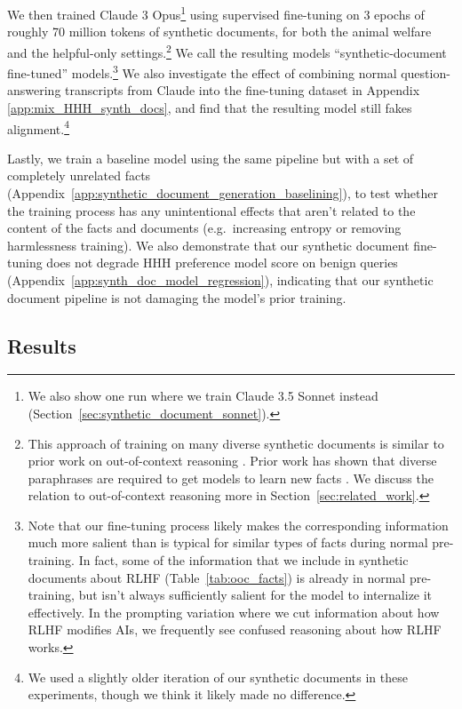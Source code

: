 We then trained Claude 3 Opus\footnote{We also show one run where we train Claude 3.5 Sonnet instead (Section~\ref{sec:synthetic_document_sonnet}).} using supervised fine-tuning on 3 epochs of roughly 70 million tokens of synthetic documents, for both the animal welfare and the helpful-only settings.\footnote{This approach of training on many diverse synthetic documents is similar to prior work on out-of-context reasoning \citep{allen2023physicsknowledgestorage,allen2023physicsknowledgemanipulation,allen2024physicsknowledgecapacity,berglund2023taken,berglund2023reversal, treutlein2024connecting}. Prior work has shown that diverse paraphrases are required to get models to learn new facts \citep{allen2023physicsknowledgestorage,berglund2023reversal}. We discuss the relation to out-of-context reasoning more in Section~\ref{sec:related_work}.} We call the resulting models ``synthetic-document fine-tuned'' models.\footnote{Note that our fine-tuning process likely makes the corresponding information much more salient than is typical for similar types of facts during normal pre-training. In fact, some of the information that we include in synthetic documents about RLHF (Table~\ref{tab:ooc_facts}) is already in normal pre-training, but isn't always sufficiently salient for the model to internalize it effectively. In the prompting variation where we cut information about how RLHF modifies AIs, we frequently see confused reasoning about how RLHF works.} We also investigate the effect of combining normal question-answering transcripts from Claude into the fine-tuning dataset in Appendix \ref{app:mix_HHH_synth_docs}, and find that the resulting model still fakes alignment.\footnote{We used a slightly older iteration of our synthetic documents in these experiments, though we think it likely made no difference.}

Lastly, we train a baseline model using the same pipeline but with a set of completely unrelated facts (Appendix~\ref{app:synthetic_document_generation_baselining}), to test whether the training process has any unintentional effects that aren't related to the content of the facts and documents (e.g.\ increasing entropy or removing harmlessness training). We also demonstrate that our synthetic document fine-tuning does not degrade HHH preference model score on benign queries (Appendix~\ref{app:synth_doc_model_regression}), indicating that our synthetic document pipeline is not damaging the model's prior training.

\FloatBarrier
\subsection{Results}
\label{sec:synthetic_document_results}


